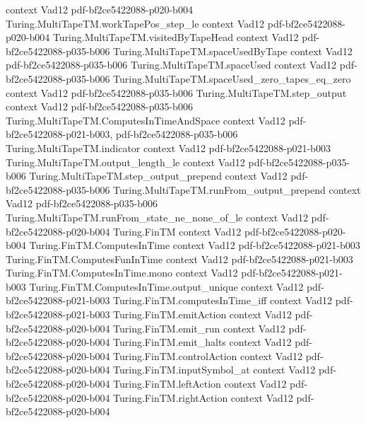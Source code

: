 \begin{theorem}
  {context}
  {Vad12}
  {pdf-bf2ce5422088-p020-b004}
\proofstep
  {Turing.MultiTapeTM.workTapePos_step_le}
  {context}
  {Vad12}
  {pdf-bf2ce5422088-p020-b004}
\proofstep
  {Turing.MultiTapeTM.visitedByTapeHead}
  {context}
  {Vad12}
  {pdf-bf2ce5422088-p035-b006}
\proofstep
  {Turing.MultiTapeTM.spaceUsedByTape}
  {context}
  {Vad12}
  {pdf-bf2ce5422088-p035-b006}
\proofstep
  {Turing.MultiTapeTM.spaceUsed}
  {context}
  {Vad12}
  {pdf-bf2ce5422088-p035-b006}
\proofstep
  {Turing.MultiTapeTM.spaceUsed_zero_tapes_eq_zero}
  {context}
  {Vad12}
  {pdf-bf2ce5422088-p035-b006}
\proofstep
  {Turing.MultiTapeTM.step_output}
  {context}
  {Vad12}
  {pdf-bf2ce5422088-p035-b006}
\proofstep
  {Turing.MultiTapeTM.ComputesInTimeAndSpace}
  {context}
  {Vad12}
  {pdf-bf2ce5422088-p021-b003,
    pdf-bf2ce5422088-p035-b006}
\proofstep
  {Turing.MultiTapeTM.indicator}
  {context}
  {Vad12}
  {pdf-bf2ce5422088-p021-b003}
\proofstep
  {Turing.MultiTapeTM.output_length_le}
  {context}
  {Vad12}
  {pdf-bf2ce5422088-p035-b006}
\proofstep
  {Turing.MultiTapeTM.step_output_prepend}
  {context}
  {Vad12}
  {pdf-bf2ce5422088-p035-b006}
\proofstep
  {Turing.MultiTapeTM.runFrom_output_prepend}
  {context}
  {Vad12}
  {pdf-bf2ce5422088-p035-b006}
\proofstep
  {Turing.MultiTapeTM.runFrom_state_ne_none_of_le}
  {context}
  {Vad12}
  {pdf-bf2ce5422088-p020-b004}
\proofstep
  {Turing.FinTM}
  {context}
  {Vad12}
  {pdf-bf2ce5422088-p020-b004}
\proofstep
  {Turing.FinTM.ComputesInTime}
  {context}
  {Vad12}
  {pdf-bf2ce5422088-p021-b003}
\proofstep
  {Turing.FinTM.ComputesFunInTime}
  {context}
  {Vad12}
  {pdf-bf2ce5422088-p021-b003}
\proofstep
  {Turing.FinTM.ComputesInTime.mono}
  {context}
  {Vad12}
  {pdf-bf2ce5422088-p021-b003}
\proofstep
  {Turing.FinTM.ComputesInTime.output_unique}
  {context}
  {Vad12}
  {pdf-bf2ce5422088-p021-b003}
\proofstep
  {Turing.FinTM.computesInTime_iff}
  {context}
  {Vad12}
  {pdf-bf2ce5422088-p021-b003}
\proofstep
  {Turing.FinTM.emitAction}
  {context}
  {Vad12}
  {pdf-bf2ce5422088-p020-b004}
\proofstep
  {Turing.FinTM.emit_run}
  {context}
  {Vad12}
  {pdf-bf2ce5422088-p020-b004}
\proofstep
  {Turing.FinTM.emit_halts}
  {context}
  {Vad12}
  {pdf-bf2ce5422088-p020-b004}
\proofstep
  {Turing.FinTM.controlAction}
  {context}
  {Vad12}
  {pdf-bf2ce5422088-p020-b004}
\proofstep
  {Turing.FinTM.inputSymbol_at}
  {context}
  {Vad12}
  {pdf-bf2ce5422088-p020-b004}
\proofstep
  {Turing.FinTM.leftAction}
  {context}
  {Vad12}
  {pdf-bf2ce5422088-p020-b004}
\proofstep
  {Turing.FinTM.rightAction}
  {context}
  {Vad12}
  {pdf-bf2ce5422088-p020-b004}
\proofstep

\end{theorem}
